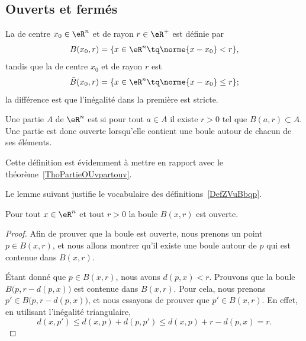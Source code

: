 \subsection{Ouverts et fermés}

\begin{definition}  \label{DefZVuBbqp}
	La  de centre $x_0 \in \eR^n$ et de rayon $r \in \eR^+$ est définie par
	\begin{equation}
		B(x_0,r) = \{ x \in \eR^n \tq \norme{x - x_0} < r \},
	\end{equation}
	tandis que la  de centre $x_0$ et de rayon $r$ est
	\begin{equation}
		\bar B(x_0,r) = \{ x \in \eR^n \tq \norme{x - x_0} \leq r \};
	\end{equation}
	la différence est que l'inégalité dans la première est stricte.
\end{definition}

\begin{definition}  \label{DefUOyCQtW}
    Une partie \( A\) de \( \eR^n\) est  si pour tout \( a\in A\) il existe \( r>0\) tel que \( B(a,r)\subset A\). Une partie est donc ouverte lorsqu'elle contient une boule autour de chacun de ses éléments.
\end{definition}
Cette définition est évidemment à mettre en rapport avec le théorème~\ref{ThoPartieOUvpartouv}.

Le lemme suivant justifie le vocabulaire des définitions~\ref{DefZVuBbqp}.
\begin{lemma}   \label{LemMESSExh}
    Pour tout $x \in \eR^n$ et tout $r >0$ la boule \( B(x,r)\) est ouverte.
\end{lemma}

\begin{proof}
    Afin de prouver que la boule est ouverte, nous prenons un point $p\in B(x,r)$, et nous allons montrer qu'il existe une boule autour de $p$ qui est contenue dans $B(x,r)$.

    Étant donné que $p\in B(x,r)$, nous avons $d(p,x)<r$. Prouvons que la boule $B\big(p,r-d(p,x)\big)$ est contenue dans $B(x,r)$. Pour cela, nous prenons $p'\in B\big(p,r-d(p,x)\big)$, et nous essayons de prouver que $p'\in B(x,r)$. En effet, en utilisant l'inégalité triangulaire,
    \begin{equation}
	    d(x,p')\leq d(x,p)+d(p,p')\leq d(x,p)+r-d(p,x)=r.
    \end{equation}
\end{proof}



